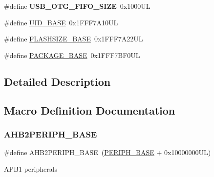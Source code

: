 \begin{DoxyCompactItemize}
\#define {\bfseries U\+S\+B\+\_\+\+O\+T\+G\+\_\+\+F\+I\+F\+O\+\_\+\+S\+I\+ZE}~0x1000\+UL
\item 
\#define \hyperlink{group___peripheral__memory__map_ga664eda42b83c919b153b07b23348be67}{U\+I\+D\+\_\+\+B\+A\+SE}~0x1\+F\+F\+F7\+A10\+UL
\item 
\#define \hyperlink{group___peripheral__memory__map_ga776d985f2d4d40b588ef6ca9d573af78}{F\+L\+A\+S\+H\+S\+I\+Z\+E\+\_\+\+B\+A\+SE}~0x1\+F\+F\+F7\+A22\+UL
\item 
\#define \hyperlink{group___peripheral__memory__map_ga88fc8a2912bd1ac72c6eddb456f0b096}{P\+A\+C\+K\+A\+G\+E\+\_\+\+B\+A\+SE}~0x1\+F\+F\+F7\+B\+F0\+UL
\end{DoxyCompactItemize}


\subsection{Detailed Description}


\subsection{Macro Definition Documentation}
\mbox{\label{group___peripheral__memory__map_gaeedaa71d22a1948492365e2cd26cfd46}} 
\subsubsection{\texorpdfstring{A\+H\+B2\+P\+E\+R\+I\+P\+H\+\_\+\+B\+A\+SE}{AHB2PERIPH\_BASE}}
{\footnotesize\ttfamily \#define A\+H\+B2\+P\+E\+R\+I\+P\+H\+\_\+\+B\+A\+SE~(\hyperlink{group___peripheral__memory__map_ga9171f49478fa86d932f89e78e73b88b0}{P\+E\+R\+I\+P\+H\+\_\+\+B\+A\+SE} + 0x10000000\+U\+L)}

A\+P\+B1 peripherals \mbox{\label{group___peripheral__memory__map_gaee19a30c9fa326bb10b547e4eaf4e250}} 
